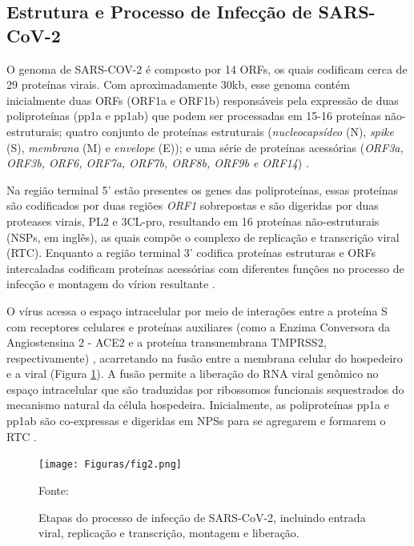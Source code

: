 \begin{justify}
\section{Estrutura e Processo de Infecção de SARS-CoV-2}

O genoma de SARS-COV-2 é composto por 14 ORFs, os quais codificam cerca de 29 proteínas virais. Com aproximadamente 30kb, esse genoma contém inicialmente duas ORFs (ORF1a e ORF1b) responsáveis pela expressão de duas poliproteínas (pp1a e pp1ab) que podem ser processadas em 15-16 proteínas não-estruturais; quatro conjunto de proteínas estruturais (\textit{nucleocapsídeo} (N), \textit{spike} (S), \textit{membrana} (M) e \textit{envelope} (E)); e uma série de proteínas acessórias (\textit{ORF3a, ORF3b, ORF6, ORF7a, ORF7b, ORF8b, ORF9b e ORF14}) \cite{Tay:2020, Vkovski:2021, Yang:2021}.

Na região terminal 5’ estão presentes os genes das poliproteínas, essas proteínas são codificados por duas regiões \textit{ORF1} sobrepostas e são digeridas por duas proteases virais, PL2 e 3CL-pro, resultando em 16 proteínas não-estruturais (NSPs, em inglês), as quais compõe o complexo de  replicação e transcrição viral (RTC).  Enquanto a região terminal 3’ codifica proteínas estruturas e ORFs intercaladas codificam proteínas acessórias com diferentes funções no processo de infecção e montagem do vírion resultante \cite{Vkovski:2021}.

O vírus acessa o espaço intracelular por meio de interações entre a proteína S com receptores celulares e proteínas auxiliares (como a Enzima Conversora da Angiostensina 2 - ACE2 e a proteína transmembrana TMPRSS2, respectivamente) , acarretando na fusão entre a membrana celular do hospedeiro e a viral (Figura \ref{fig:fig2}). A fusão permite a liberação do RNA viral genômico no espaço intracelular que são traduzidas por ribossomos funcionais sequestrados do mecanismo natural da célula hospedeira. Inicialmente, as poliproteínas pp1a e pp1ab são co-expressas e digeridas em NPSs para se agregarem e formarem o RTC \cite{Tay:2020, Yang:2021}.

\begin{figure}
    \centering
    \caption{\justifying Etapas do processo de infecção de SARS-CoV-2, incluindo entrada viral, replicação e transcrição, montagem e liberação. }
    \texttt{[image: Figuras/fig2.png]}
    \label{fig:fig2}
    \begin{minipage}{0.7\textwidth} %
        \centering
        \footnotesize Fonte: 
    \end{minipage}


\end{figure}
\end{justify}
